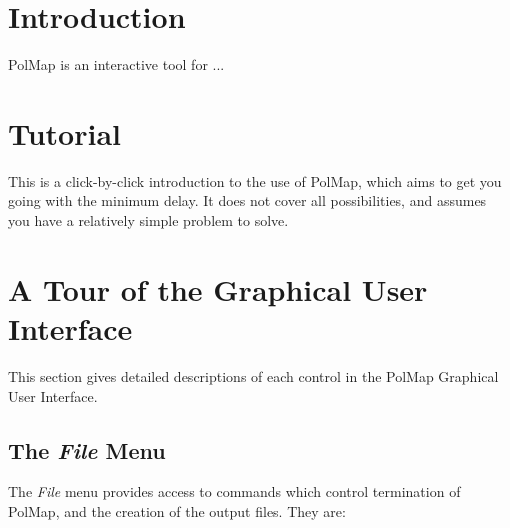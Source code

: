  \newpage
 \begin{latexonly}
   \setlength{\parskip}{0mm}
   \latexonlytoc
   \setlength{\parskip}{\medskipamount}
   \markright{\stardocname}
 \end{latexonly}
\newpage
\renewcommand{\thepage}{\arabic{page}}
\setcounter{page}{1}

\section {Introduction}
PolMap is an interactive tool for ...

\section {Tutorial}
This is a click-by-click introduction to the use of PolMap, which aims to
get you going with the minimum delay. It does not cover all possibilities,
and assumes you have a relatively simple problem to solve. 

\section {A Tour of the Graphical User Interface}
This section gives detailed descriptions of each control in the PolMap 
Graphical User Interface. 

\subsection {The {\em File} Menu}
The {\em File} menu provides access to commands which control
termination of PolMap, and the creation of the output files. They are:

\subsubsection {} 

\subsubsection {} 

